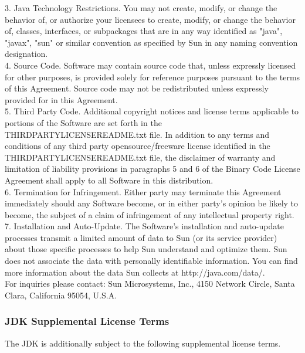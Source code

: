 {   3. Java Technology Restrictions. You may not create, modify, or
   change the behavior of, or authorize your licensees to create,
   modify, or change the behavior of, classes, interfaces, or
   subpackages that are in any way identified as "java", "javax",
   "sun" or similar convention as specified by Sun in any naming
   convention designation.
\\[4pt]
   4. Source Code. Software may contain source code that, unless
   expressly licensed for other purposes, is provided solely for
   reference purposes pursuant to the terms of this Agreement. Source
   code may not be redistributed unless expressly provided for in this
   Agreement.
\\[4pt]
   5. Third Party Code. Additional copyright notices and license terms
   applicable to portions of the Software are set forth in the
   THIRDPARTYLICENSEREADME.txt file. In addition to any terms and
   conditions of any third party opensource/freeware license
   identified in the THIRDPARTYLICENSEREADME.txt file, the disclaimer
   of warranty and limitation of liability provisions in paragraphs 5
   and 6 of the Binary Code License Agreement shall apply to all
   Software in this distribution.
\\[4pt]
   6. Termination for Infringement. Either party may terminate this
   Agreement immediately should any Software become, or in either
   party's opinion be likely to become, the subject of a claim of
   infringement of any intellectual property right.
\\[4pt]
   7. Installation and Auto-Update. The Software's installation and
   auto-update processes transmit a limited amount of data to Sun (or
   its service provider) about those specific processes to help Sun
   understand and optimize them. Sun does not associate the data with
   personally identifiable information. You can find more information
   about the data Sun collects at http://java.com/data/.
\\[4pt]
For inquiries please contact: Sun Microsystems, Inc., 4150 Network
Circle, Santa Clara, California 95054, U.S.A.
}


\subsubsection{JDK Supplemental License Terms}

\setlength{\baselineskip}{\oldbaselineskip}
\noindent
The JDK is additionally subject to the following supplemental license terms.
\\

